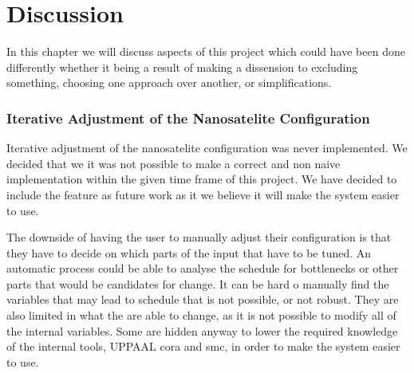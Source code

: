 \chapter{Discussion} \label{sec:discussion}
In this chapter we will discuss aspects of this project which could have been done differently whether it being a result of making a dissension to excluding something, choosing one approach over another, or simplifications.

\subsection*{Iterative Adjustment of the Nanosatelite Configuration} \label{subsec:disc_itt}
Iterative adjustment of the nanosatelite configuration was never implemented. We decided that we it was not possible to make a correct and non naive implementation within the given time frame of this project. We have decided to include the feature as future work as it we believe it will make the system easier to use.

The downside of having the user to manually adjust their configuration is that they have to decide on which parts of the input that have to be tuned. An automatic process could be able to analyse the schedule for bottlenecks or other parts that would be candidates for change. It can be hard o manually find the variables that may lead to schedule that is not possible, or not robust. They are also limited in what the are able to change, as it is not possible to modify all of the internal variables. Some are hidden anyway to lower the required knowledge of the internal tools, UPPAAL \gls{cora} and \gls{smc}, in order to make the system easier to use. 

